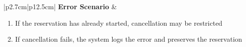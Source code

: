 \begin{table}[H]
\begin{tabular}{|p{2.7cm}|p{12.5cm}|}
            \hline
            \textbf{Error Scenario} & \begin{minipage}[t]{\linewidth}
                                          \begin{enumerate}[topsep=0pt,itemsep=1pt,parsep=0pt,partopsep=0pt]
                                              \item If the reservation has already started, cancellation may be restricted
                                              \item If cancellation fails, the system logs the error and preserves the reservation
                                          \end{enumerate}
                                      \end{minipage} \\
            \hline
        \end{tabular}
        \label{tab:eng-cancel-reservation}
    \end{table}

